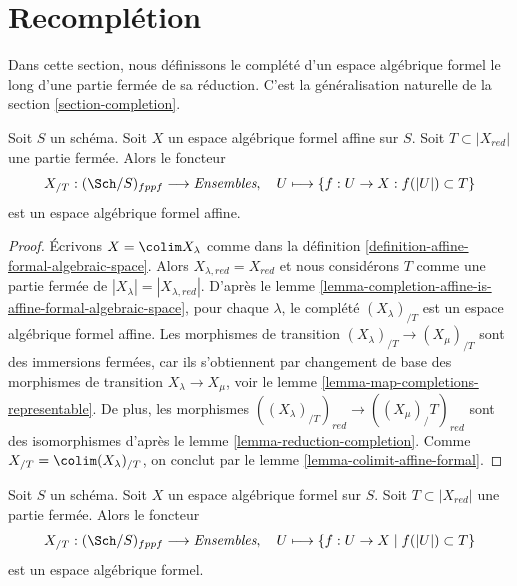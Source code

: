 \section{Recomplétion}
\label{section-recompletion}

\noindent
Dans cette section, nous définissons le complété d'un espace algébrique
formel le long d'une partie fermée de sa réduction. C'est la généralisation
naturelle de la section \ref{section-completion}.

\begin{lemma}
\label{lemma-completion-affine-formal-is-affine-formal}
Soit $S$ un schéma. Soit $X$ un espace algébrique formel affine sur $S$.
Soit $T \subset |X_{red}|$ une partie fermée. Alors le foncteur
$$
X_{/T} : (\Sch/S)_{fppf} \longrightarrow \textit{Ensembles},\quad
U \longmapsto \{f : U \to X : f(|U|) \subset T\}
$$
est un espace algébrique formel affine.
\end{lemma}

\begin{proof}
Écrivons $X = \colim X_\lambda$ comme dans la
définition \ref{definition-affine-formal-algebraic-space}.
Alors $X_{\lambda, red} = X_{red}$ et nous considérons
$T$ comme une partie fermée de $|X_\lambda| = |X_{\lambda, red}|$.
D'après le lemme \ref{lemma-completion-affine-is-affine-formal-algebraic-space},
pour chaque $\lambda$, le complété
$(X_\lambda)_{/T}$ est un espace algébrique formel affine.
Les morphismes de transition $(X_\lambda)_{/T} \to (X_\mu)_{/T}$ sont des
immersions fermées, car ils s'obtiennent par changement de base des morphismes de transition
$X_\lambda \to X_\mu$, voir le lemme \ref{lemma-map-completions-representable}.
De plus, les morphismes $((X_\lambda)_{/T})_{red} \to ((X_\mu)_/T)_{red}$
sont des isomorphismes d'après le lemme \ref{lemma-reduction-completion}.
Comme $X_{/T} = \colim (X_\lambda)_{/T}$, on conclut
par le lemme \ref{lemma-colimit-affine-formal}.
\end{proof}

\begin{lemma}
\label{lemma-completion-fas-is-fas}
Soit $S$ un schéma. Soit $X$ un espace algébrique formel sur $S$.
Soit $T \subset |X_{red}|$ une partie fermée. Alors le foncteur
$$
X_{/T} : (\Sch/S)_{fppf} \longrightarrow \textit{Ensembles},\quad
U \longmapsto \{f : U \to X \mid f(|U|) \subset T\}
$$
est un espace algébrique formel.
\end{lemma}

